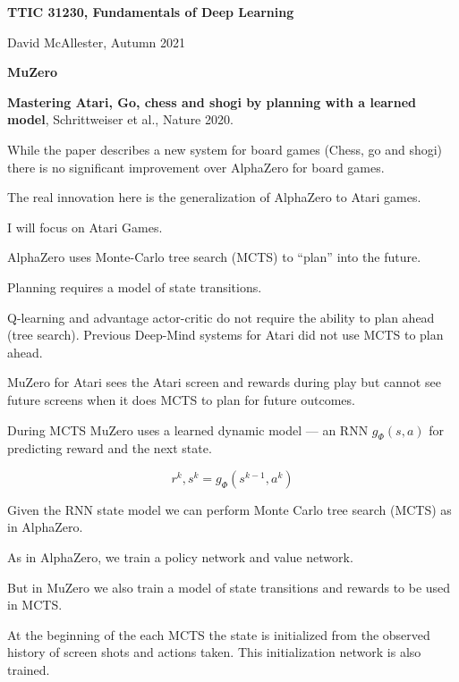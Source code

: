 




{\Huge

  \centerline{\bf TTIC 31230, Fundamentals of Deep Learning}
  \bigskip
  \centerline{David McAllester, Autumn 2021}

  \vfill
  \centerline{\bf MuZero}
  \vfill
  \vfill


{\bf Mastering Atari, Go, chess and shogi by planning with a learned model}, Schrittweiser et al., Nature 2020.

\vfill
While the paper describes a new system for board games (Chess, go and shogi) there is no significant improvement over AlphaZero for board games.

\vfill
The real innovation here is the generalization of AlphaZero to Atari games.

\vfill
I will focus on Atari Games.


AlphaZero uses Monte-Carlo tree search (MCTS) to ``plan'' into the future.

\vfill
Planning requires a model of state transitions.

\vfill
Q-learning and advantage actor-critic do not require the ability to plan ahead (tree search). Previous Deep-Mind systems for Atari did not use MCTS to plan ahead.


\vfill
MuZero for Atari sees the Atari screen and rewards during play but cannot see future screens when it does MCTS to plan for future outcomes.

\vfill
During MCTS MuZero uses a learned dynamic model --- an RNN $g_\Phi(s,a)$ for predicting reward and the next state.

\vfill
$$r^k,s^k = g_\Phi(s^{k-1},a^k)$$

\vfill
Given the RNN state model we can perform Monte Carlo tree search (MCTS) as in AlphaZero.


As in AlphaZero, we train a policy network and value network.

\vfill
But in MuZero we also train a model of state transitions and rewards to be used in MCTS.

\vfill
At the beginning of the each MCTS the state is initialized from the observed history of screen shots and actions taken.  This initialization network is also trained.

}
